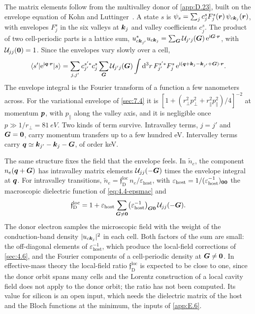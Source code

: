 The matrix elements follow from the multivalley donor of \cref{app:D.23}, built on the envelope equation of Kohn and Luttinger~\cite{kohn1955theory}. A state $s$ is $\psi_s = \sum_jc^s_jF^s_j(\bm{r})\,\psi_{c\bm{k}_j}(\bm{r})$, with envelopes $F^s_j$ in the six valleys at $\bm{k}_j$ and valley coefficients $c^s_j$. The product of two cell-periodic parts is a lattice sum, $u_{c\bm{k}_{j'}}^*u_{c\bm{k}_j} = \sum_{\bm{G}}\mathcal{U}_{j'j}(\bm{G})\,\mathrm{e}^{\mathrm{i}\bm{G}\cdot\bm{r}}$, with $\mathcal{U}_{jj}(\bm{0}) = 1$. Since the envelopes vary slowly over a cell,
\begin{equation}
  \langle s'|\mathrm{e}^{\mathrm{i}\bm{q}\cdot\bm{r}}|s\rangle = \sum_{j,j'}c^{s'*}_{j'}c^s_j\sum_{\bm{G}}\mathcal{U}_{j'j}(\bm{G})\int\mathrm{d}^3r\,F^{s'*}_{j'}F^s_j\,\mathrm{e}^{\mathrm{i}(\bm{q} + \bm{k}_j - \bm{k}_{j'} + \bm{G})\cdot\bm{r}} .
  \label{eq:16.5-ff}
\end{equation}
The envelope integral is the Fourier transform of a function a few nanometers across. For the variational envelope of \cref{sec:7.4} it is $[1 + (r_\perp^2p_\perp^2 + r_\parallel^2p_\parallel^2)/4]^{-2}$ at momentum $\bm{p}$, with $p_\parallel$ along the valley axis, and it is negligible once $p \gg 1/r_\perp = \SI{81}{eV}$. Two kinds of term survive. Intravalley terms, $j = j'$ and $\bm{G} = \bm{0}$, carry momentum transfers up to a few hundred eV. Intervalley terms carry $\bm{q} \simeq \bm{k}_{j'} - \bm{k}_j - \bm{G}$, of order keV.

The same structure fixes the field that the envelope feels. In $\tilde n_e$, the component $n_e(\bm{q} + \bm{G})$ has intravalley matrix elements $\mathcal{U}_{jj}(-\bm{G})$ times the envelope integral at $\bm{q}$. For intravalley transitions, $\tilde n_e = \mathfrak{f}^{\mathrm{loc}}_{\mathrm{D}}\,n_e/\varepsilon_{\mathrm{host}}$, with $\varepsilon_{\mathrm{host}} = 1/(\varepsilon_{\mathrm{host}}^{-1})_{\bm{0}\bm{0}}$ the macroscopic dielectric function of \cref{eq:4.4-epsmac} and
\begin{equation}
  \mathfrak{f}^{\mathrm{loc}}_{\mathrm{D}} = 1 + \varepsilon_{\mathrm{host}}\sum_{\bm{G}\ne\bm{0}}\bigl(\varepsilon_{\mathrm{host}}^{-1}\bigr)_{\bm{G}\bm{0}}\,\mathcal{U}_{jj}(-\bm{G}) .
  \label{eq:16.5-floc}
\end{equation}
The donor electron samples the microscopic field with the weight of the conduction-band density $|u_{c\bm{k}_j}|^2$ in each cell. Both factors of the sum are small: the off-diagonal elements of $\varepsilon_{\mathrm{host}}^{-1}$, which produce the local-field corrections of \cref{sec:4.6}, and the Fourier components of a cell-periodic density at $\bm{G} \ne \bm{0}$. In effective-mass theory the local-field ratio $\mathfrak{f}^{\mathrm{loc}}_{\mathrm{D}}$ is expected to be close to one, since the donor orbit spans many cells and the Lorentz construction of a local cavity field does not apply to the donor orbit; the ratio has not been computed. Its value for silicon is an open input, which needs the dielectric matrix of the host and the Bloch functions at the minimum, the inputs of \cref{app:E.6}.

